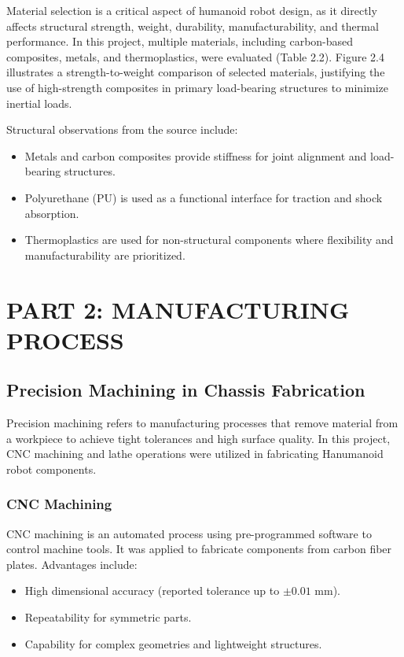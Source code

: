 Material selection is a critical aspect of humanoid robot design, as it directly affects structural strength, weight, durability, manufacturability, and thermal performance. In this project, multiple materials, including carbon-based composites, metals, and thermoplastics, were evaluated (Table 2.2). Figure 2.4 illustrates a strength-to-weight comparison of selected materials, justifying the use of high-strength composites in primary load-bearing structures to minimize inertial loads.

Structural observations from the source include:
\begin{itemize}
    \item Metals and carbon composites provide stiffness for joint alignment and load-bearing structures.
    \item Polyurethane (PU) is used as a functional interface for traction and shock absorption.
    \item Thermoplastics are used for non-structural components where flexibility and manufacturability are prioritized.
\end{itemize}

\section{PART 2: MANUFACTURING PROCESS}

\subsection{Precision Machining in Chassis Fabrication}

Precision machining refers to manufacturing processes that remove material from a workpiece to achieve tight tolerances and high surface quality. In this project, CNC machining and lathe operations were utilized in fabricating Hanumanoid robot components.

\subsubsection*{CNC Machining}

CNC machining is an automated process using pre-programmed software to control machine tools. It was applied to fabricate components from carbon fiber plates. Advantages include:
\begin{itemize}
    \item High dimensional accuracy (reported tolerance up to $\pm 0.01$ mm).
    \item Repeatability for symmetric parts.
    \item Capability for complex geometries and lightweight structures.
\end{itemize}

